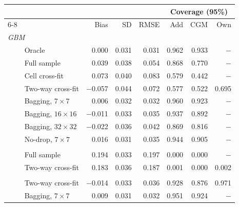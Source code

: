 \begin{tabular}{llrrrrrr}
\toprule
 &  & \multicolumn{3}{c}{} & \multicolumn{3}{c}{Coverage (95\%)} \\ \cmidrule(lr){6-8}
 &  & Bias & SD & RMSE & Add & CGM & Own \\
\midrule
\multicolumn{8}{l}{\emph{GBM}} \\
 & Oracle & 0.000 & 0.031 & 0.031 & 0.962 & 0.933 & $-$ \\
 & Full sample & 0.039 & 0.038 & 0.054 & 0.868 & 0.770 & $-$ \\
 & Cell cross-fit & 0.073 & 0.040 & 0.083 & 0.579 & 0.442 & $-$ \\
 & Two-way cross-fit & $-$0.057 & 0.044 & 0.072 & 0.577 & 0.522 & 0.695 \\
 & Bagging, $7\times7$ & 0.006 & 0.032 & 0.032 & 0.960 & 0.923 & $-$ \\
 & Bagging, $16\times16$ & $-$0.011 & 0.033 & 0.035 & 0.937 & 0.892 & $-$ \\
 & Bagging, $32\times32$ & $-$0.022 & 0.036 & 0.042 & 0.869 & 0.816 & $-$ \\
 & No-drop, $7\times7$ & 0.016 & 0.031 & 0.035 & 0.944 & 0.905 & $-$ \\
\addlinespace
\multicolumn{8}{l}{\emph{Lasso}} \\
 & Full sample & 0.194 & 0.033 & 0.197 & 0.000 & 0.000 & $-$ \\
 & Two-way cross-fit & 0.183 & 0.036 & 0.187 & 0.001 & 0.000 & 0.002 \\
\addlinespace
\multicolumn{8}{l}{\emph{No attributes}} \\
 & Two-way cross-fit & $-$0.014 & 0.033 & 0.036 & 0.928 & 0.876 & 0.971 \\
 & Bagging, $7\times7$ & 0.009 & 0.031 & 0.032 & 0.951 & 0.924 & $-$ \\
\bottomrule
\end{tabular}
